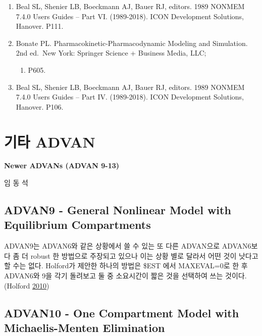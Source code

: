 \documentclass[
  10pt,
]{krantz}
\providecommand{\tightlist}{%
  \setlength{\itemsep}{0pt}\setlength{\parskip}{0pt}}
\begin{document}
\begin{enumerate}
\def\labelenumi{\arabic{enumi}.}
\item
  Beal SL, Shenier LB, Boeckmann AJ, Bauer RJ, editors. 1989 NONMEM
  7.4.0 Users Guides -- Part VI. (1989-2018). ICON Development
  Solutions, Hanover. P111.
\item
  Bonate PL. Pharmacokinetic-Pharmacodynamic Modeling and Simulation.
  2nd ed.~New York: Springer Science + Business Media, LLC;

  \begin{enumerate}
  \def\labelenumii{\arabic{enumii}.}
  \setcounter{enumii}{2010}
  \tightlist
  \item
    P605.
  \end{enumerate}
\item
  Beal SL, Shenier LB, Boeckmann AJ, Bauer RJ, editors. 1989 NONMEM
  7.4.0 Users Guides -- Part IV. (1989-2018). ICON Development
  Solutions, Hanover. P106.
\end{enumerate}

\hypertarget{uxae30uxd0c0-advan}{%
\chapter{기타 ADVAN}\label{uxae30uxd0c0-advan}}

\textbf{Newer ADVANs (ADVAN 9-13)}

임 동 석

\hypertarget{advan9---general-nonlinear-model-with-equilibrium-compartments}{%
\section{ADVAN9 - General Nonlinear Model with Equilibrium Compartments}\label{advan9---general-nonlinear-model-with-equilibrium-compartments}}

ADVAN9는 ADVAN6와 같은 상황에서 쓸 수 있는 또 다른 ADVAN으로 ADVAN6보다 좀 더 robust 한 방법으로 주장되고 있으나 이는 상황 별로 달라서 어떤 것이 낫다고 할 수는 없다. Holford가 제안한 하나의 방법은 \$EST 에서 MAXEVAL=0로 한 후 ADVAN6와 9을 각기 돌려보고 둘 중 소요시간이 짧은 것을 선택하여 쓰는 것이다. (Holford \protect\hyperlink{ref-nickholford}{2010})

\hypertarget{advan10---one-compartment-model-with-michaelis-menten-elimination}{%
\section{ADVAN10 - One Compartment Model with Michaelis-Menten Elimination}\label{advan10---one-compartment-model-with-michaelis-menten-elimination}}
\end{document}
